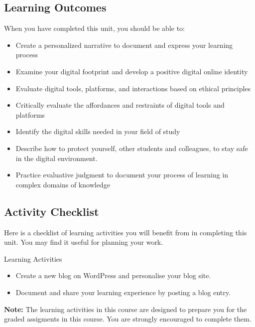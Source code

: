 \documentclass[
]{book}
\providecommand{\tightlist}{%
  \setlength{\itemsep}{0pt}\setlength{\parskip}{0pt}}
\theoremstyle{definition}
\theoremstyle{definition}
\theoremstyle{definition}
\theoremstyle{definition}
\theoremstyle{remark}
\begin{document}
\hypertarget{learning-outcomes-3}{%
\subsection*{Learning Outcomes}\label{learning-outcomes-3}}

When you have completed this unit, you should be able to:

\begin{itemize}
\tightlist
\item
  Create a personalized narrative to document and express your learning process
\item
  Examine your digital footprint and develop a positive digital online identity
\item
  Evaluate digital tools, platforms, and interactions based on ethical principles
\item
  Critically evaluate the affordances and restraints of digital tools and platforms
\item
  Identify the digital skills needed in your field of study
\item
  Describe how to protect yourself, other students and colleagues, to stay safe in the digital environment.
\item
  Practice evaluative judgment to document your process of learning in complex domains of knowledge
\end{itemize}

\hypertarget{activity-checklist-3}{%
\subsection*{Activity Checklist}\label{activity-checklist-3}}

Here is a checklist of learning activities you will benefit from in completing this unit. You may find it useful for planning your work.

\begin{reflect}
{Learning Activities}

\begin{itemize}
\tightlist
\item
  Create a new blog on WordPress and personalise your blog site.
\item
  Document and share your learning experience by posting a blog entry.
\end{itemize}

\textbf{Note:} The learning activities in this course are designed to prepare you for the graded assigments in this course. You are strongly encouraged to complete them.
\end{reflect}
\end{document}
